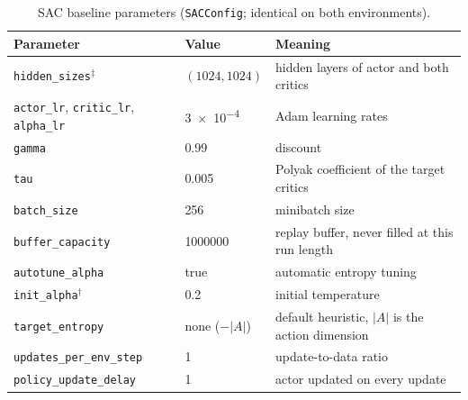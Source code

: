 \begin{table}[tbp]
  \centering
  \footnotesize
  \caption{SAC baseline parameters (\texttt{SACConfig}; identical on both environments).}
  \label{tab:app-hp-sac}
  \begin{tabular}{@{}p{4.7cm}p{3.7cm}p{5.0cm}@{}}
    \toprule
    Parameter                                                               & Value                         & Meaning                                      \\
    \midrule
    \texttt{hidden\_sizes}$^{\ddagger}$                                     & $(1024,1024)$                 & hidden layers of actor and both critics      \\
    \texttt{actor\_lr}, \texttt{critic\_lr}, \texttt{alpha\_lr}             & \num{3e-4}                    & Adam learning rates                          \\
    \texttt{gamma}                                                          & \num{0.99}                    & discount                                     \\
    \texttt{tau}                                                            & \num{0.005}                   & Polyak coefficient of the target critics     \\
    \texttt{batch\_size}                                                    & \num{256}                     & minibatch size                               \\
    \texttt{buffer\_capacity}                                               & \num{1000000}                 & replay buffer, never filled at this run length \\
    \texttt{autotune\_alpha}                                                & true                          & automatic entropy tuning                     \\
    \texttt{init\_alpha}$^{\dagger}$                                        & \num{0.2}                     & initial temperature                          \\
    \texttt{target\_entropy}                                                & none ($-|A|$)                 & default heuristic, $|A|$ is the action dimension \\
    \texttt{updates\_per\_env\_step}                                        & \num{1}                       & update-to-data ratio                         \\
    \texttt{policy\_update\_delay}                                          & \num{1}                       & actor updated on every update                \\
    \bottomrule
  \end{tabular}
\end{table}

